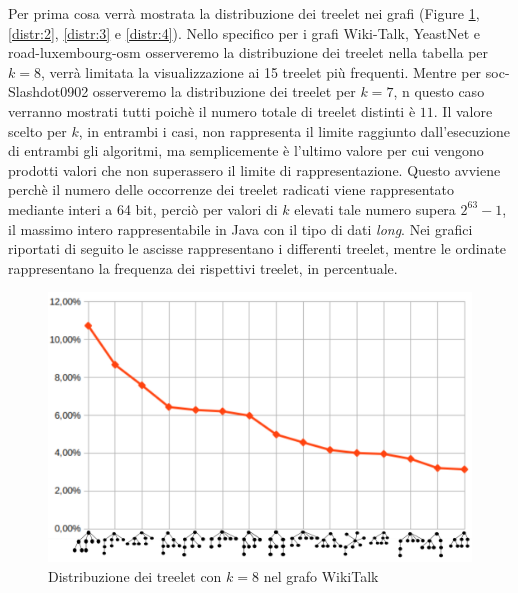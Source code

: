 Per prima cosa verrà mostrata la distribuzione dei treelet nei grafi (Figure \ref{distr:1}, \ref{distr:2}, \ref{distr:3} e \ref{distr:4}).
Nello specifico per i grafi Wiki-Talk, YeastNet e road-luxembourg-osm osserveremo la distribuzione dei treelet nella tabella per $ k = 8 $, verrà limitata la visualizzazione ai 15 treelet più frequenti.
Mentre per soc-Slashdot0902 osserveremo la distribuzione dei treelet per $ k=7 $, 
 n questo caso verranno mostrati tutti poichè il numero totale di treelet distinti è $11$.
Il valore scelto per $ k $, in entrambi i casi, non rappresenta il limite raggiunto dall'esecuzione di entrambi gli algoritmi, ma semplicemente è l'ultimo valore per cui vengono prodotti valori che non superassero il limite di rappresentazione.
Questo avviene perchè il numero delle occorrenze dei treelet radicati viene rappresentato mediante interi a 64 bit, perciò per valori di $ k $ elevati tale numero supera $2^{63}-1$, il massimo intero rappresentabile in Java con il tipo di dati \emph{long}.
Nei grafici riportati di seguito le ascisse rappresentano i differenti treelet, mentre le ordinate rappresentano la frequenza dei rispettivi treelet, in percentuale.
\renewcommand{\thefigure}{\arabic{figure}}
\begin{figure}[htbp]
	\centering
	\includegraphics[width=\textwidth]{capitolo4/grafoWIKI}
		\caption{Distribuzione dei treelet con $ k=8 $ nel grafo WikiTalk}
		\label{distr:1}
\end{figure}\mbox{}
\\\\\\\\\\\\
